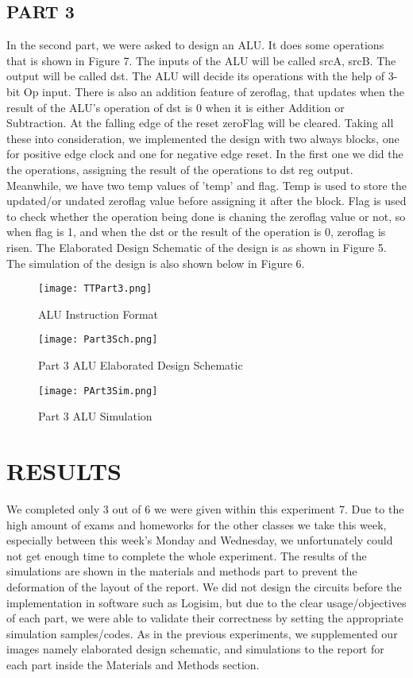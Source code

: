 \documentclass[pdftex,12pt,a4paper]{article}
\begin{document}
\subsection{PART 3}
In the second part, we were asked to design an ALU. It does some operations that is shown in Figure 7. The inputs of the ALU will be called srcA, srcB. The output will
be called dst. The ALU will decide its operations with the help of 3-bit Op input. There is also an addition feature of zeroflag, that updates when the result of the ALU's operation of dst is 0 when it is either Addition or Subtraction. At the falling edge of the reset zeroFlag will be cleared. Taking all these into consideration, we implemented the design with two always blocks, one for positive edge clock and one for negative edge reset. In the first one we did the the operations, assigning the result of the operations to dst reg output. Meanwhile, we have two temp values of 'temp' and flag. Temp is used to store the updated/or undated zeroflag value before assigning it after the block. Flag is used to check whether the operation being done is chaning the zeroflag value or not, so when flag is 1, and when the dst or the result of the operation is 0, zeroflag is risen. The Elaborated Design Schematic of the design is as shown in Figure 5. The simulation of the design is also shown below in Figure 6. 

\begin{figure}[ht]
	\centering
	\texttt{[image: TTPart3.png]}
	\caption{ALU Instruction Format}
	\label{fig1}
\end{figure}


\begin{figure}[ht]
	\centering
	\texttt{[image: Part3Sch.png]}
	\caption{Part 3 ALU Elaborated Design Schematic}
	\label{fig1}
\end{figure}

\begin{figure}[ht]
	\centering
	\texttt{[image: PArt3Sim.png]}
	\caption{Part 3 ALU Simulation}
	\label{fig1}
\end{figure}


\newpage
\section{RESULTS }
We completed only 3 out of 6 we were given within this experiment 7. Due to the high amount of exams and homeworks for the other classes we take this week, especially between this week's Monday and Wednesday, we unfortunately could not get enough time to complete the whole experiment. The results of the simulations are shown in the materials and methods part to prevent the deformation of the layout of the report. We did not design the circuits before the implementation in software such as Logisim, but due to the clear usage/objectives of each part, we were able to validate their correctness by setting the appropriate simulation samples/codes. As in the previous experiments, we supplemented our images namely elaborated design schematic, and simulations to the report for each part inside the Materials and Methods section.
\end{document}
